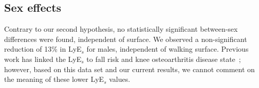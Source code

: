 \documentclass[authoryear,preprint,review,12pt]{elsarticle}
\begin{document}

\subsection{Sex effects}
Contrary to our second hypothesis, no statistically significant between-sex differences were found, independent of surface. We observed a non-significant reduction of 13\%  in LyE${_s}$ for males, independent of walking surface. Previous work has linked the LyE${_s}$ to fall risk and knee osteoarthritis disease state~\citep{bruijn2013assessing, emmerzaal_movement_2022}; however, 
based on this data set and our current results, we cannot comment on the meaning of these lower LyE$_{s}$ values. 
\end{document}
